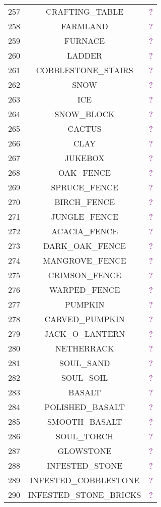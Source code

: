 \documentclass[11pt]{article}
\newcommand\myworries[1]{\textcolor{purple}{#1}}
\begin{document}
\begin{longtable}{ |c|c|c| }
	257 & CRAFTING\_TABLE & \myworries{?} \\
	258 & FARMLAND & \myworries{?} \\
	259 & FURNACE & \myworries{?} \\
	260 & LADDER & \myworries{?} \\
	261 & COBBLESTONE\_STAIRS & \myworries{?} \\
	262 & SNOW & \myworries{?} \\
	263 & ICE & \myworries{?} \\
	264 & SNOW\_BLOCK & \myworries{?} \\
	265 & CACTUS & \myworries{?} \\
	266 & CLAY & \myworries{?} \\
	267 & JUKEBOX & \myworries{?} \\
	268 & OAK\_FENCE & \myworries{?} \\
	269 & SPRUCE\_FENCE & \myworries{?} \\
	270 & BIRCH\_FENCE & \myworries{?} \\
	271 & JUNGLE\_FENCE & \myworries{?} \\
	272 & ACACIA\_FENCE & \myworries{?} \\
	273 & DARK\_OAK\_FENCE & \myworries{?} \\
	274 & MANGROVE\_FENCE & \myworries{?} \\
	275 & CRIMSON\_FENCE & \myworries{?} \\
	276 & WARPED\_FENCE & \myworries{?} \\
	277 & PUMPKIN & \myworries{?} \\
	278 & CARVED\_PUMPKIN & \myworries{?} \\
	279 & JACK\_O\_LANTERN & \myworries{?} \\
	280 & NETHERRACK & \myworries{?} \\
	281 & SOUL\_SAND & \myworries{?} \\
	282 & SOUL\_SOIL & \myworries{?} \\
	283 & BASALT & \myworries{?} \\
	284 & POLISHED\_BASALT & \myworries{?} \\
	285 & SMOOTH\_BASALT & \myworries{?} \\
	286 & SOUL\_TORCH & \myworries{?} \\
	287 & GLOWSTONE & \myworries{?} \\
	288 & INFESTED\_STONE & \myworries{?} \\
	289 & INFESTED\_COBBLESTONE & \myworries{?} \\
	290 & INFESTED\_STONE\_BRICKS & \myworries{?} \\

\end{longtable}
\end{document}
